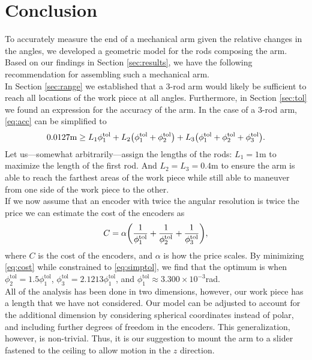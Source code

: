 \documentclass[12pt,a4paper]{article}
\let\originalleft\left
\let\originalright\right
\renewcommand{\left}{\mathopen{}\mathclose\bgroup\originalleft}
\renewcommand{\right}{\aftergroup\egroup\originalright}
\begin{document}
\section{Conclusion}
To accurately measure the end of a mechanical arm given the relative changes in the angles, we developed a geometric model for the rods composing the arm. Based on our findings in Section \ref{sec:results}, we have the following recommendation for assembling such a mechanical arm. \\

In Section \ref{sec:range} we established that a 3-rod arm would likely be sufficient to reach all locations of the work piece at all angles. Furthermore, in Section \ref{sec:tol} we found an expression for the accuracy of the arm. In the case of a 3-rod arm, \eqref{eq:acc} can be simplified to
\begin{align}
0.0127\text{m} \geq  L_1  \phi_1^\text{tol} +  L_2 \left( \phi_1^\text{tol} + \phi_2^\text{tol} \right) + L_3 \left( \phi_1^\text{tol} + \phi_2^\text{tol} + \phi_3^\text{tol} \right).
\label{eq:simptol}
\end{align}
Let us---somewhat arbitrarily---assign the lengths of the rods: $L_1 = 1$m to maximize the length of the first rod. And $L_2 = L_3 = 0.4$m to ensure the arm is able to reach the farthest areas of the work piece while still able to maneuver from one side of the work piece to the other. \\

If we now assume that an encoder with twice the angular resolution is twice the price we can estimate the cost of the encoders as
\begin{align}
C = \alpha \left( \frac{1}{\phi_1^\text{tol}} + \frac{1}{\phi_2^\text{tol}} + \frac{1}{\phi_3^\text{tol}} \right),
\label{eq:cost}
\end{align}
where $C$ is the cost of the encoders, and $\alpha$ is how the price scales. By minimizing \eqref{eq:cost} while constrained to \eqref{eq:simptol}, we find that the optimum is when $\phi_2^\text{tol} = 1.5\phi_1^\text{tol}$, $\phi_3^\text{tol} = 2.1213\phi_1^\text{tol}$, and $\phi_1^\text{tol} \approx 3.300 \times 10^{-3}$rad. \\

All of the analysis has been done in two dimensions, however, our work piece has a length that we have not considered. Our model can be adjusted to account for the additional dimension by considering spherical coordinates instead of polar, and including further degrees of freedom in the encoders. This generalization, however, is non-trivial. Thus, it is our suggestion to mount the arm to a slider fastened to the ceiling to allow motion in the $z$ direction.
\end{document}
